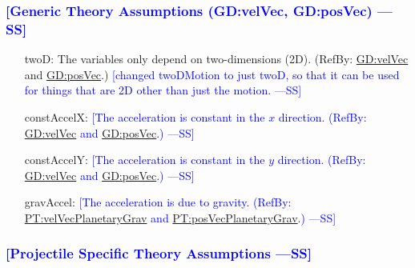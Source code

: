 \documentclass[12pt]{article}
\newcommand{\authornote}[3]{\textcolor{#1}{[#3 ---#2]}}
\newcommand{\authornote}[3]{}
\newcommand{\wss}[1]{\authornote{blue}{SS}{#1}}
\begin{document}
\subsubsection{\wss{Generic Theory Assumptions (GD:velVec, GD:posVec)}}

\begin{itemize}
\item[twoD:\phantomsection\label{twoD}]{The variables only depend on
two-dimensions (2D). (RefBy: \hyperref[GD:velVec]{GD:velVec} and
\hyperref[GD:posVec]{GD:posVec}.)} \wss{changed twoDMotion to just twoD, so that
it can be used for things that are 2D other than just the motion.}
\item[constAccelX:\phantomsection\label{constAccelX}]{\wss{The acceleration is constant in the $x$ direction. (RefBy: \hyperref[GD:velVec]{GD:velVec} and \hyperref[GD:posVec]{GD:posVec}.)}}
\item[constAccelY:\phantomsection\label{constAccelY}]{\wss{The acceleration is constant in the $y$ direction. (RefBy: \hyperref[GD:velVec]{GD:velVec} and \hyperref[GD:posVec]{GD:posVec}.)}}
\item[gravAccel:\phantomsection\label{gravAccel}]{\wss{The acceleration is due to gravity. (RefBy: \hyperref[PT:velVecPlanetaryGrav]{PT:velVecPlanetaryGrav} and \hyperref[PT:posVecPlanetaryGrav]{PT:posVecPlanetaryGrav}.)}}

\end{itemize}

\subsubsection{\wss{Projectile Specific Theory Assumptions}}
\end{document}
